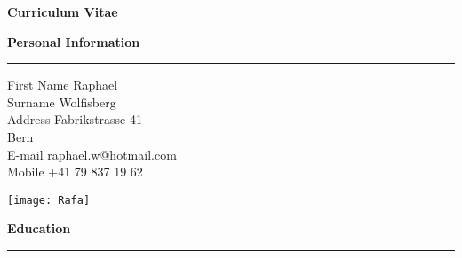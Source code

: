



\graphicspath{{./Pictures/}}


\newpage
\pagestyle{plain}
\vspace{-9cm}

\huge
\textbf{Curriculum Vitae}

\bigskip
\bigskip
\bigskip
\bigskip
\large
\textbf{Personal Information}
\noindent\rule[3mm]{\linewidth}{1pt}

\normalsize
\vspace{-0.5cm}
\begin{tabbing}
First Name \hspace*{2.4cm} \= Raphael \\
Surname \> Wolfisberg \\
Address \> Fabrikstrasse 41 \\
\>  Bern \\[0.1 cm]

E-mail \> raphael.w@hotmail.com \\
Mobile \> +41 79 837 19 62 
\end{tabbing}

\begin{addmargin}{0.03\textwidth}
\vspace{-4.4cm}
\begin{flushright}
\texttt{[image: Rafa]} \\[1cm]
\end{flushright}
\end{addmargin}


\vspace{-0.5cm}
\large
\textbf{Education}
\noindent\rule[3mm]{\linewidth}{1pt}

